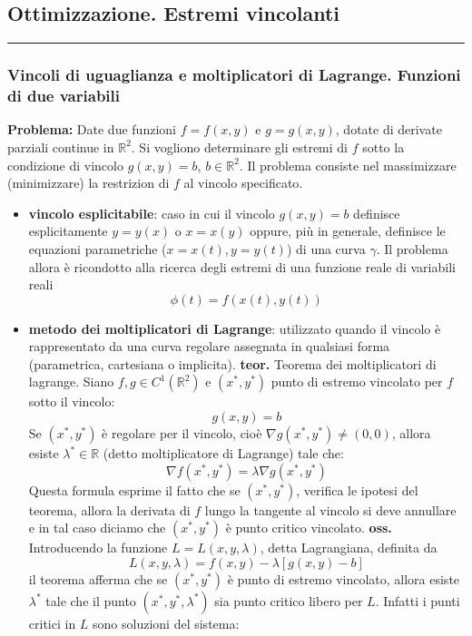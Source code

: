 \subsection{Ottimizzazione. Estremi vincolanti}
\rule{\textwidth}{0,4pt}
\subsubsection{Vincoli di uguaglianza e moltiplicatori di Lagrange. Funzioni di due variabili}
\textbf{Problema:} Date due funzioni $f= f(x,y)$ e $g = g(x,y)$, dotate di derivate parziali continue in $\mathbb{R}^2$. Si vogliono determinare gli estremi di $f$ sotto la condizione di vincolo $g(x,y) = b$, $b \in \mathbb{R}^2$.\newline
Il problema consiste nel massimizzare (minimizzare) la restrizion di $f$ al vincolo specificato.
\begin{tcolorbox}
\begin{itemize}
    \item \textbf{vincolo esplicitabile}: caso in cui il vincolo $g(x,y) = b$ definisce esplicitamente $y=y(x)$ o $x = x(y)$ oppure, più in generale, definisce le equazioni parametriche ($x= x(t), y = y(t)$) di una curva $\gamma$. Il problema allora è ricondotto alla ricerca degli estremi di una funzione reale di variabili reali
    \[
        \phi(t) = f(x(t), y(t))
    \]
    \item \textbf{metodo dei moltiplicatori di Lagrange}: utilizzato quando il vincolo è rappresentato da una curva regolare assegnata in qualsiasi forma (parametrica, cartesiana o implicita).\newline
    \textbf{teor.} Teorema dei moltiplicatori di lagrange. Siano $f,g \in C^1(\mathbb{R}^2)$ e $(x^*, y^*)$ punto di estremo vincolato per $f$ sotto il vincolo:
    \[
        g(x,y) = b
    \]
    Se $(x^*, y^*)$ è regolare per il vincolo, cioè $\nabla g(x^*, y^*) \neq (0,0)$, allora esiste $\lambda^* \in \mathbb{R}$ (detto moltiplicatore di Lagrange) tale che:
    \[
        \nabla f(x^*, y^*) = \lambda \nabla g(x^*, y^*)
    \]
    Questa formula esprime il fatto che se $(x^*, y^*)$, verifica le ipotesi del teorema, allora la derivata di $f$ lungo la tangente al vincolo si deve annullare e in tal caso diciamo che $(x^*, y^*)$ è punto critico vincolato.\newline
    \textbf{oss.} Introducendo la funzione $L = L (x, y , \lambda)$, detta Lagrangiana, definita da
    \[
        L(x,y,\lambda) = f(x,y) - \lambda[g(x,y) - b]
    \] 
    il teorema afferma che se $(x^*, y^*)$ è punto di estremo vincolato, allora esiste $\lambda^*$ tale che il punto $(x^*, y^*, \lambda^*)$ sia punto critico libero per $L$. Infatti i punti critici in $L$ sono soluzioni del sistema:

\end{itemize}
\end{tcolorbox}
